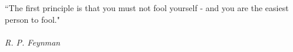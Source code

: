 \clearpage

\narrowlinespacing

\vspace*{4mm}

``The first principle is that you must not fool yourself - and you are the easiest person to fool."\\
\\
\emph{R. P. Feynman}

\normallinespacing